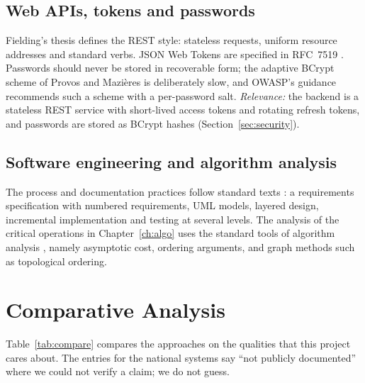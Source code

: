 \subsection{Web APIs, tokens and passwords}
Fielding's thesis \cite{fielding2000} defines the REST style: stateless requests, uniform
resource addresses and standard verbs. JSON Web Tokens are specified in RFC~7519
\cite{rfc7519}. Passwords should never be stored in recoverable form; the adaptive
BCrypt scheme of Provos and Mazi\`eres \cite{provos1999} is deliberately slow, and OWASP's
guidance \cite{owasp-pw} recommends such a scheme with a per-password salt.
\emph{Relevance:} the backend is a stateless REST service with short-lived access
tokens and rotating refresh tokens, and passwords are stored as BCrypt hashes
(Section~\ref{sec:security}).

\subsection{Software engineering and algorithm analysis}
The process and documentation practices follow standard texts
\cite{sommerville2015,pressman2019}: a requirements specification with numbered
requirements, UML models, layered design, incremental implementation and testing at
several levels. The analysis of the critical operations in Chapter~\ref{ch:algo}
uses the standard tools of algorithm analysis \cite{cormen2022}, namely asymptotic
cost, ordering arguments, and graph methods such as topological ordering.

\section{Comparative Analysis}
Table~\ref{tab:compare} compares the approaches on the qualities that this project
cares about. The entries for the national systems say ``not publicly documented''
where we could not verify a claim; we do not guess.

